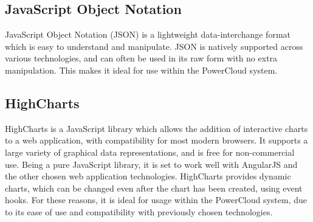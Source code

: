\documentclass{article}
\begin{document}
	\subsection{JavaScript Object Notation}
	
	JavaScript Object Notation (JSON) is a lightweight data-interchange 
	format which is easy to understand and manipulate. JSON is natively 
	supported across various technologies, and can often be used in its 
	raw form with no extra manipulation. This makes it ideal for use 
	within the PowerCloud system.
	
	\subsection{HighCharts}
	
	HighCharts is a JavaScript library which allows the addition of 
	interactive charts to a web application, with compatibility for most 
	modern browsers. It supports a large variety of graphical data 
	representations, and is free for non-commercial use. Being a pure 
	JavaScript library, it is set to work well with AngularJS and the 
	other chosen web application technologies. HighCharts provides 
	dynamic charts, which can be changed even after the chart has been 
	created, using event hooks. For these reasons, it is ideal for usage 
	within the PowerCloud system, due to its ease of use and 
	compatibility with previously chosen technologies. 
\end{document}
